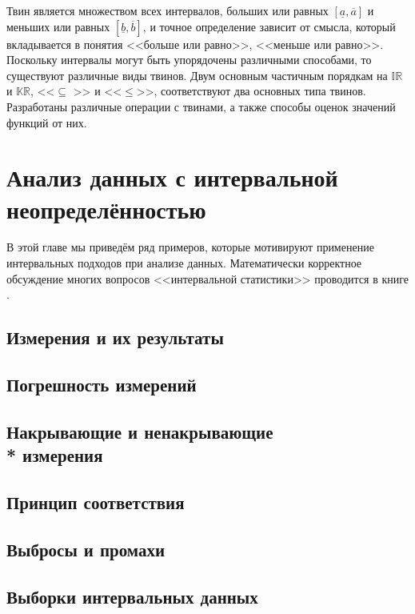 \documentclass[a5paper,openany]{book}
\newcommand{\ov}{\overline}
\newcommand{\un}{\underline}
\begin{document}
Твин является множеством всех интервалов, больших или равных $[\un{a}, \ov{a}]$ и меньших
или равных $[\un{b}, \ov{b}]$, и точное определение зависит от смысла, который вкладывается в понятия <<больше или равно>>, <<меньше или равно>>.
Поскольку интервалы могут быть упорядочены различными способами, то существуют 
различные виды твинов. Двум основным частичным порядкам на $\mathbb{IR}$ и $\mathbb{KR}$, 
<<$\subseteq$ >> и <<$\leq$>>,  соответствуют два основных типа твинов. Разработаны 
различные операции с твинами, а также способы оценок значений функций от них. 


\section{Анализ данных с интервальной неопределённостью}

В этой главе мы приведём ряд примеров, которые мотивируют применение интервальных подходов при анализе данных. Математически корректное обсуждение многих вопросов <<интервальной статистики>> проводится в книге \cite{BookIntStat}. 

\subsection{Измерения и их результаты} 
\label{MeasuResultSect} 

\subsection{Погрешность измерений} 

\subsection[Накрывающие и ненакрывающие измерения]%
{Накрывающие и ненакрывающие \\* измерения} 
\label{CoverMeasrSect} 

\subsection{Принцип соответствия} 
\label{CorresPrincpSect}

\subsection{Выбросы и промахи} 
\label{OutlierSect}

\subsection{Выборки интервальных данных} 
\label{InteSampleSect} 
\end{document}
